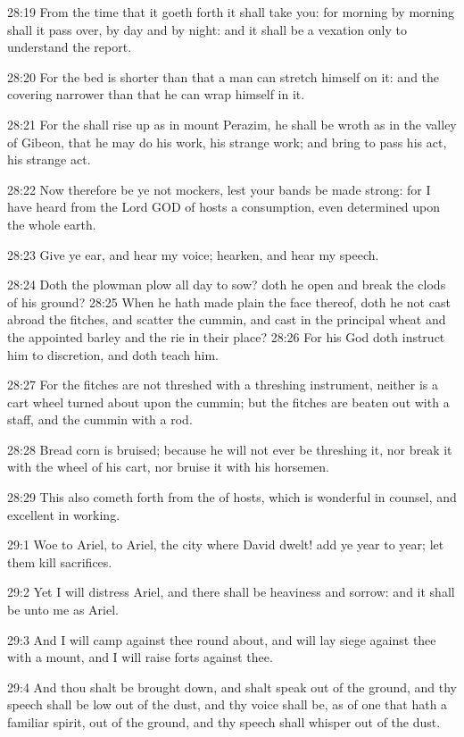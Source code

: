 28:19 From the time that it goeth forth it shall take you: for morning
by morning shall it pass over, by day and by night: and it shall be a
vexation only to understand the report.

28:20 For the bed is shorter than that a man can stretch himself on
it: and the covering narrower than that he can wrap himself in it.

28:21 For the \LORD shall rise up as in mount Perazim, he shall be
wroth as in the valley of Gibeon, that he may do his work, his strange
work; and bring to pass his act, his strange act.

28:22 Now therefore be ye not mockers, lest your bands be made strong:
for I have heard from the Lord GOD of hosts a consumption, even
determined upon the whole earth.

28:23 Give ye ear, and hear my voice; hearken, and hear my speech.

28:24 Doth the plowman plow all day to sow? doth he open and break the
clods of his ground?  28:25 When he hath made plain the face thereof,
doth he not cast abroad the fitches, and scatter the cummin, and cast
in the principal wheat and the appointed barley and the rie in their
place?  28:26 For his God doth instruct him to discretion, and doth
teach him.

28:27 For the fitches are not threshed with a threshing instrument,
neither is a cart wheel turned about upon the cummin; but the fitches
are beaten out with a staff, and the cummin with a rod.

28:28 Bread corn is bruised; because he will not ever be threshing it,
nor break it with the wheel of his cart, nor bruise it with his
horsemen.

28:29 This also cometh forth from the \LORD of hosts, which is
wonderful in counsel, and excellent in working.

29:1 Woe to Ariel, to Ariel, the city where David dwelt! add ye year
to year; let them kill sacrifices.

29:2 Yet I will distress Ariel, and there shall be heaviness and
sorrow: and it shall be unto me as Ariel.

29:3 And I will camp against thee round about, and will lay siege
against thee with a mount, and I will raise forts against thee.

29:4 And thou shalt be brought down, and shalt speak out of the
ground, and thy speech shall be low out of the dust, and thy voice
shall be, as of one that hath a familiar spirit, out of the ground,
and thy speech shall whisper out of the dust.

